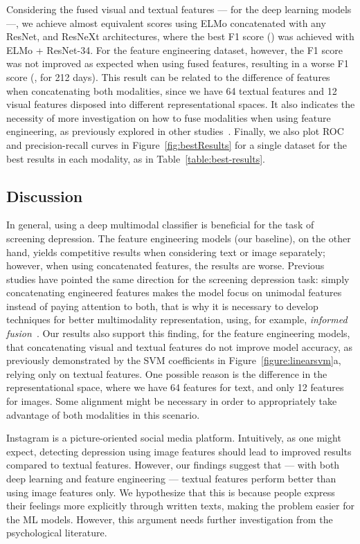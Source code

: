 \documentclass[letterpaper]{article} \usepackage{aaai20}  \usepackage{times}  \usepackage{helvet} \usepackage{courier}  \usepackage[hyphens]{url}  \usepackage{graphicx} \urlstyle{rm} \def\UrlFont{\rm}  \usepackage{graphicx}  \frenchspacing  \setlength{\pdfpagewidth}{8.5in}  \setlength{\pdfpageheight}{11in}  \usepackage[final]{changes}
\begin{document}
Considering the fused visual and textual features --- for the deep learning models ---, we achieve almost equivalent scores using ELMo concatenated with any ResNet, and ResNeXt architectures, where the best F1 score () was achieved with ELMo + ResNet-34. For the feature engineering dataset, however, the F1 score was not improved as expected when using fused features, resulting in a worse F1 score (, for 212 days). This result can be related to the difference of features when concatenating both modalities, since we have 64 textual features and 12 visual features disposed into different representational spaces. It also indicates the necessity of more investigation on how to fuse modalities when using feature engineering, as previously explored in other studies~\cite{morales2018linguistically}. Finally, we also plot ROC and precision-recall curves in Figure~\ref{fig:bestResults} for a single dataset for the best results in each modality, as in Table~\ref{table:best-results}.


\subsection{Discussion} In general, using a deep multimodal classifier is beneficial for the task of screening depression. The feature engineering models (our baseline), on the other hand, yields competitive results when considering text or image separately; however, when using concatenated features, the results are worse. Previous studies have pointed the same direction for the screening depression task: simply concatenating engineered features makes the model focus on unimodal features instead of paying attention to both, that is why it is necessary to develop techniques for better multimodality representation, using, for example, \textit{informed fusion}~\cite{morales2018linguistically}. Our results also support this finding, for the feature engineering models, that concatenating visual and textual features do not improve model accuracy, as previously demonstrated by the SVM coefficients in Figure~\ref{figure:linearsvm}a, relying only on textual features. One possible reason is the difference in the representational space, where we have 64 features for text, and only 12 features for images. Some alignment might be necessary in order to appropriately take advantage of both modalities in this scenario.

Instagram is a picture-oriented social media platform. Intuitively, as one might expect, detecting depression using image features should lead to improved results compared to textual features. However, our findings suggest that --- with both deep learning and feature engineering --- textual features perform better than using image features only. We hypothesize that this is because people express their feelings more explicitly through written texts, making the problem easier for the ML models. However, this argument needs further investigation from the psychological literature. 
\end{document}
